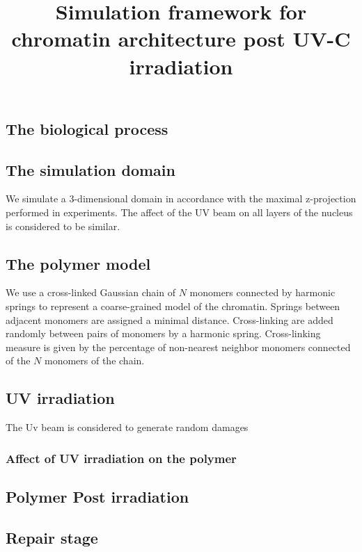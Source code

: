 \documentclass[12pt]{report}
\begin{document}
	
	\title{Simulation framework for chromatin architecture post UV-C irradiation}
	\subsection{The biological process}
	
	\subsection{The simulation domain}
	We simulate a 3-dimensional domain in accordance with the maximal z-projection performed in experiments. The affect of the UV beam on all layers of the nucleus is considered to be similar. 
	\subsection{The polymer model}
	We use a cross-linked Gaussian chain of $N$ monomers connected by harmonic springs to represent a coarse-grained model of the chromatin. Springs between adjacent monomers are assigned a minimal distance. Cross-linking are added randomly between pairs of monomers by a harmonic spring. Cross-linking measure is given by the percentage of non-nearest neighbor monomers connected of the $N$ monomers of the chain.
	
	
	\subsection{UV irradiation}
	The Uv beam is considered to generate random damages 
	\subsubsection{Affect of UV irradiation on the polymer}
	
	\subsection{Polymer Post irradiation}
	
	\subsection{Repair stage}
	
	
\end{document}

